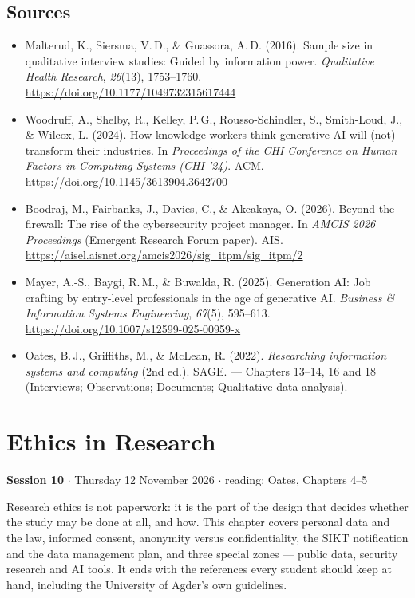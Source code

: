 \documentclass[11pt,a4paper,british,twoside=false,headings=small,chapterprefix=false,numbers=noenddot]{scrbook}
\newcommand{\sessionhead}[2]{\begin{tcolorbox}[enhanced, colback=uiamutedblue, colframe=uiamutedblue, arc=1.5pt, left=6pt, right=6pt]
  \small \textbf{Session #1} \;$\cdot$\; #2\end{tcolorbox}}
\begin{document}
\section*{Sources}
\begin{itemize}\small
  \item Malterud, K., Siersma, V.\,D., \& Guassora, A.\,D. (2016). Sample size in qualitative interview studies: Guided by information power. \emph{Qualitative Health Research}, \emph{26}(13), 1753--1760. \url{https://doi.org/10.1177/1049732315617444}
  \item Woodruff, A., Shelby, R., Kelley, P.\,G., Rousso-Schindler, S., Smith-Loud, J., \& Wilcox, L. (2024). How knowledge workers think generative AI will (not) transform their industries. In \emph{Proceedings of the CHI Conference on Human Factors in Computing Systems (CHI '24)}. ACM. \url{https://doi.org/10.1145/3613904.3642700}
  \item Boodraj, M., Fairbanks, J., Davies, C., \& Akcakaya, O. (2026). Beyond the firewall: The rise of the cybersecurity project manager. In \emph{AMCIS 2026 Proceedings} (Emergent Research Forum paper). AIS. \url{https://aisel.aisnet.org/amcis2026/sig_itpm/sig_itpm/2}
  \item Mayer, A.-S., Baygi, R.\,M., \& Buwalda, R. (2025). Generation AI: Job crafting by entry-level professionals in the age of generative AI. \emph{Business \& Information Systems Engineering}, \emph{67}(5), 595--613. \url{https://doi.org/10.1007/s12599-025-00959-x}
  \item Oates, B.\,J., Griffiths, M., \& McLean, R. (2022). \emph{Researching information systems and computing} (2nd ed.). SAGE. --- Chapters 13--14, 16 and 18 (Interviews; Observations; Documents; Qualitative data analysis).
\end{itemize}

\chapter{Ethics in Research}
\label{ch:10}
\sessionhead{10}{Thursday 12 November 2026 \;$\cdot$\; reading: Oates, Chapters 4--5}

Research ethics is not paperwork: it is the part of the design that decides whether the study may be done at all, and how. This chapter covers personal data and the law, informed consent, anonymity versus confidentiality, the SIKT notification and the data management plan, and three special zones --- public data, security research and AI tools. It ends with the references every student should keep at hand, including the University of Agder's own guidelines.
\end{document}
